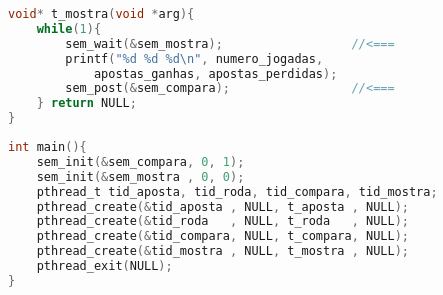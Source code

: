 \documentclass{sope}
\begin{document}
\begin{lstlisting}[language=C]
void* t_mostra(void *arg){
    while(1){
        sem_wait(&sem_mostra);                  //<===
        printf("%d %d %d\n", numero_jogadas,
            apostas_ganhas, apostas_perdidas);
        sem_post(&sem_compara);                 //<===
    } return NULL;
}
\end{lstlisting}
\begin{lstlisting}[language=C]
int main(){
    sem_init(&sem_compara, 0, 1);
    sem_init(&sem_mostra , 0, 0);
    pthread_t tid_aposta, tid_roda, tid_compara, tid_mostra;
    pthread_create(&tid_aposta , NULL, t_aposta , NULL);
    pthread_create(&tid_roda   , NULL, t_roda   , NULL);
    pthread_create(&tid_compara, NULL, t_compara, NULL);
    pthread_create(&tid_mostra , NULL, t_mostra , NULL);
    pthread_exit(NULL);
}
\end{lstlisting}
\end{document}
